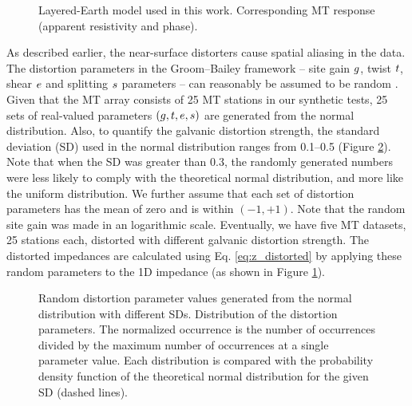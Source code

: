 	\begin{figure}[t]
		\centering
		\caption[Layered-earth model used in this study and corresponding response]{ Layered-Earth model used in this work.  Corresponding MT response (apparent resistivity and phase).}\label{fig:lyrearth_resp}
	\end{figure}

	As described earlier, the near-surface distorters cause spatial aliasing in the data.
	The distortion parameters in the Groom--Bailey framework -- site gain $g$, twist $t$, shear $e$ and splitting $s$ parameters -- can reasonably be assumed to be random \citep[e.g.,][]{avdeeva2015a}. 
	Given that the MT array consists of 25 MT stations in our synthetic tests, 25 sets of real-valued parameters $(g,t,e,s)$ are generated from the normal distribution.
	Also, to quantify the galvanic distortion strength, the standard deviation (SD) used in the normal distribution ranges from 0.1--0.5 (Figure \ref{fig:dparam}). Note that when the SD was greater than 0.3, the randomly generated numbers were less likely to comply with the theoretical normal distribution, and more like the uniform distribution.
	We further assume that each set of distortion parameters has the mean of zero and is within $(-1,+1)$. Note that the random site gain was made in an logarithmic scale.
	Eventually, we have five MT datasets, 25 stations each, distorted with different galvanic distortion strength. The distorted impedances are calculated using Eq. \eqref{eq:z_distorted} by applying these random parameters to the 1D impedance (as shown in Figure \ref{fig:lyrearth_resp}).

	\begin{figure}[t]	
		\centering
		\caption[Distortion parameters and their distribution]{ Random distortion parameter values generated from the normal distribution with different SDs.  Distribution of the distortion parameters. The normalized occurrence is the number of occurrences divided by the maximum number of occurrences at a single parameter value. Each distribution is compared with the probability density function of the theoretical normal distribution for the given SD (dashed lines).}
		\label{fig:dparam}
	\end{figure}
	

